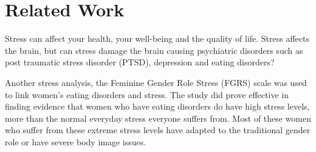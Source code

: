 \section{Related Work}
\label{sec:Related-Work}

Stress can affect your health, your well-being and the quality of life. Stress affects the brain, but can stress damage the brain causing psychiatric disorders such as post traumatic stress disorder (PTSD), depression and eating disorders? 

Another stress analysis, the Feminine Gender Role Stress (FGRS) scale was used to link women's eating disorders and stress. The study did prove effective in finding evidence that women who have eating disorders do have high stress levels, more than the normal everyday stress everyone suffers from. Most of these women who suffer from these extreme stress levels have adapted to the traditional gender role or have severe body image issues. 
